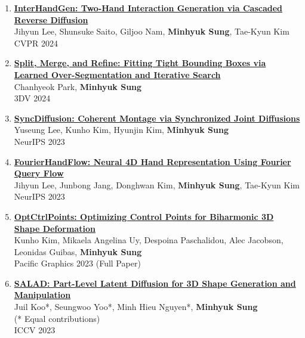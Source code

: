 \documentclass[letterpaper,10pt]{article} %
\newcommand{\blankline}{\quad\pagebreak[2]}
\begin{document}
{\begin{enumerate}
\item \label{cvpr24_1}
\href{https://arxiv.org/abs/2403.17422}{\textbf{InterHandGen: Two-Hand Interaction Generation via Cascaded Reverse Diffusion}}\\
Jihyun Lee, Shunsuke Saito, Giljoo Nam, \textbf{Minhyuk Sung}, Tae-Kyun Kim\\
CVPR 2024\\
\blankline

\item \label{3dv24}
\href{https://arxiv.org/abs/2304.04336}{\textbf{Split, Merge, and Refine: Fitting Tight Bounding Boxes via Learned Over-Segmentation and Iterative Search}}\\
Chanhyeok Park, \textbf{Minhyuk Sung}\\
3DV 2024\\
\blankline

\item \label{neurips23_2}
\href{https://arxiv.org/abs/2306.05178}{\textbf{SyncDiffusion: Coherent Montage via Synchronized Joint Diffusions}}\\
Yuseung Lee, Kunho Kim, Hyunjin Kim, \textbf{Minhyuk Sung}\\
NeurIPS 2023\\
\blankline

\item \label{neurips23_1}
\href{https://arxiv.org/abs/2307.08100}{\textbf{FourierHandFlow: Neural 4D Hand Representation Using Fourier Query Flow}}\\
Jihyun Lee, Junbong Jang, Donghwan Kim, \textbf{Minhyuk Sung}, Tae-Kyun Kim\\
NeurIPS 2023\\
\blankline

\item \label{pg23}
\href{https://arxiv.org/abs/2309.12899}{\textbf{OptCtrlPoints: Optimizing Control Points for Biharmonic 3D Shape Deformation}}\\
Kunho Kim, Mikaela Angelina Uy, Despoina Paschalidou, Alec Jacobson, Leonidas Guibas, \textbf{Minhyuk Sung}\\
Pacific Graphics 2023 (Full Paper)\\
\blankline

\item \label{iccv23}
\href{https://arxiv.org/abs/2303.12236}{\textbf{SALAD: Part-Level Latent Diffusion for 3D Shape Generation and Manipulation}}\\
Juil Koo*, Seungwoo Yoo*, Minh Hieu Nguyen*, \textbf{Minhyuk Sung}\\
(* Equal contributions)\\
ICCV 2023\\
\blankline


\end{enumerate}}
\end{document}
